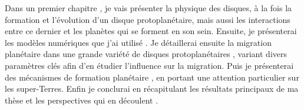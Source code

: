 Dans un premier chapitre , je vais présenter la physique des disques, à la fois la formation et l'évolution d'un disque protoplanétaire, mais aussi les interactions entre ce dernier et les planètes qui se forment en son sein. Ensuite, je présenterai les modèles numériques que j'ai utilisé . Je détaillerai ensuite la migration planétaire dans une grande variété de disques protoplanétaires , variant divers paramètres clés afin d'en étudier l'influence sur la migration. Puis je présenterai des mécanismes de formation planétaire , en portant une attention particulier sur les super-Terres. Enfin je conclurai en récapitulant les résultats principaux de ma thèse et les perspectives qui en découlent .

